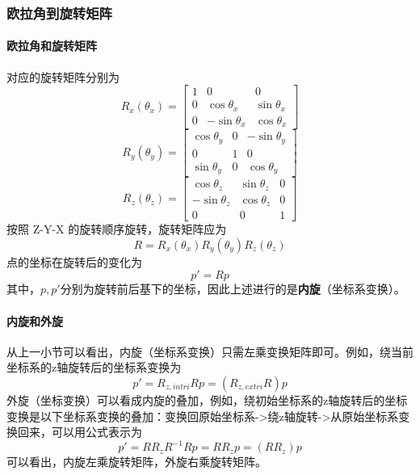 \documentclass{ctexart}
\begin{document}
	\subsubsection{欧拉角到旋转矩阵}
	\paragraph{欧拉角和旋转矩阵}
	对应的旋转矩阵分别为
	\begin{equation}
	R_x(\theta_x)=
	\begin{bmatrix}
	1 & 0 & 0 \\
	0 & \cos \theta_x & \sin \theta_x \\
	0 & -\sin \theta_x & \cos \theta_x
	\end{bmatrix}
	\end{equation}
	\begin{equation}
	R_y(\theta_y)=
	\begin{bmatrix}
	\cos \theta_y & 0 & -\sin \theta_y \\
	0 & 1 & 0 \\
	\sin \theta_y & 0 & \cos \theta_y
	\end{bmatrix}
	\end{equation}
	\begin{equation}
	R_z(\theta_z)=
	\begin{bmatrix}
	\cos \theta_z & \sin \theta_z & 0 \\
	-\sin \theta_z & \cos \theta_z & 0 \\
	0 & 0 & 1
	\end{bmatrix}
	\end{equation}
	按照 Z-Y-X 的旋转顺序旋转，旋转矩阵应为
	\begin{equation}
	R=R_x(\theta_x) R_y(\theta_y) R_z(\theta_z)
	\end{equation}
	点的坐标在旋转后的变化为
	\begin{equation}
	p' = R p
	\end{equation}
	其中，$p,p'$分别为旋转前后基下的坐标，因此上述进行的是\textbf{内旋}（坐标系变换）。
	\paragraph{内旋和外旋}
	从上一小节可以看出，内旋（坐标系变换）只需左乘变换矩阵即可。例如，绕当前坐标系的z轴旋转后的坐标系变换为
	\begin{equation}
	p' = R_{z,intri} R p = (R_{z,extri} R) p
	\end{equation}
	外旋（坐标变换）可以看成内旋的叠加，例如，绕初始坐标系的z轴旋转后的坐标变换是以下坐标系变换的叠加：变换回原始坐标系->绕z轴旋转->从原始坐标系变换回来，可以用公式表示为
	\begin{equation}
	p' = R R_z R^{-1} R p = R R_z p = (R R_z) p
	\end{equation}
	可以看出，内旋左乘旋转矩阵，外旋右乘旋转矩阵。
\end{document}
